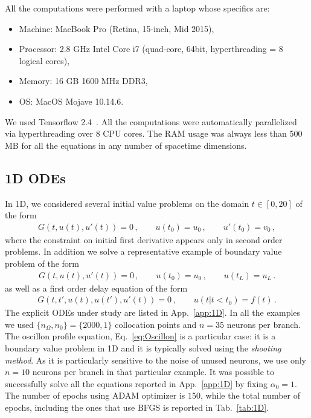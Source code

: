 \documentclass{article}
\begin{document}
All the computations were performed with a laptop whose specifics are:
\begin{itemize}
\item Machine: MacBook Pro (Retina, 15-inch, Mid 2015),
\item Processor: 2.8 GHz Intel Core i7 (quad-core, 64bit, hyperthreading = 8 logical cores),
\item Memory: 16 GB 1600 MHz DDR3,
\item OS: MacOS Mojave 10.14.6.
\end{itemize}

We used \textsf{Tensorflow 2.4}~\cite{abadi2016tensorflow, dillon2017tensorflow}. All the computations were automatically parallelized via hyperthreading over 8 CPU cores. The RAM usage was always less than 500 MB for all the equations in any number of spacetime dimensions.


\subsection{1D ODEs}
\label{sec:1DODEs}

In 1D, we considered several initial value problems on the domain $t \in [0, 20]$ of the form
\begin{eqnarray}
G(t, u(t), u'(t)) = 0 \,, \qquad u(t_0) = u_0 \,, \qquad u'(t_0) = v_0 \,,
\end{eqnarray}
where the constraint on initial first derivative appears only in second order problems. In addition we solve a representative example of boundary value problem of the form
\begin{eqnarray}
G(t, u(t), u'(t)) = 0 \,, \qquad u(t_0) = u_0 \,, \qquad u(t_L) = u_L \,.
\end{eqnarray}
as well as a first order delay equation of the form
\begin{eqnarray}
G(t,t', u(t),u(t'), u'(t)) = 0 \,, \qquad u(t|t<t_0) = f(t) \,.
\end{eqnarray}
The explicit ODEs under study are listed in App.~\ref{app:1D}.
In all the examples we used $\{ n_{\Omega},n_{0}\}=\{ 2000,1\}$ collocation points and $n = 35$ neurons per branch. The oscillon profile equation, Eq.~\ref{eq:Oscillon} is a particular case: it is a boundary value problem in 1D and it is typically solved using the \textit{shooting method}. As it is particularly sensitive to the noise of unused neurons, we use only $n = 10$ neurons per branch in that particular example. It was possible to successfully solve all the equations reported in App.~\ref{app:1D} by fixing $\alpha_0=1$. The number of epochs using ADAM optimizer is $150$, while the total number of epochs, including the ones that use BFGS is reported in Tab.~\ref{tab:1D}.\\
\end{document}
